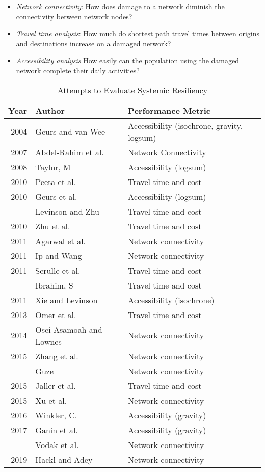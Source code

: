 \documentclass[
  letterpaper,
]{trb}
\begin{document}
\begin{itemize}
\item
  \emph{Network connectivity}: How does damage to a network diminish the
  connectivity between network nodes?
\item
  \emph{Travel time analysis}: How much do shortest path travel times
  between origins and destinations increase on a damaged network?
\item
  \emph{Accessibility analysis} How easily can the population using the
  damaged network complete their daily activities?
\end{itemize}

\hypertarget{tbl-authortable}{}
\begin{table}
\caption{\label{tbl-authortable}Attempts to Evaluate Systemic Resiliency }\tabularnewline

\centering
\begin{tabular}[t]{rll}
\toprule
Year & Author & Performance Metric\\
\midrule
2004 & Geurs and van Wee & Accessibility (isochrone, gravity, logsum)\\
2007 & Abdel-Rahim et al. & Network Connectivity\\
2008 & Taylor, M & Accessibility (logsum)\\
2010 & Peeta et al. & Travel time and cost\\
2010 & Geurs et al. & Accessibility (logsum)\\
\addlinespace
2010 & Levinson and Zhu & Travel time and cost\\
2010 & Zhu et al. & Travel time and cost\\
2011 & Agarwal et al. & Network connectivity\\
2011 & Ip and Wang & Network connectivity\\
2011 & Serulle et al. & Travel time and cost\\
\addlinespace
2011 & Ibrahim, S & Travel time and cost\\
2011 & Xie and Levinson & Accessibility (isochrone)\\
2013 & Omer et al. & Travel time and cost\\
2014 & Osei-Asamoah and Lownes & Network connectivity\\
2015 & Zhang et al. & Network connectivity\\
\addlinespace
2015 & Guze & Network connectivity\\
2015 & Jaller et al. & Travel time and cost\\
2015 & Xu et al. & Network connectivity\\
2016 & Winkler, C. & Accessibility (gravity)\\
2017 & Ganin et al. & Accessibility (gravity)\\
\addlinespace
2019 & Vodak et al. & Network connectivity\\
2019 & Hackl and Adey & Network connectivity\\
\bottomrule
\end{tabular}
\end{table}
\end{document}
